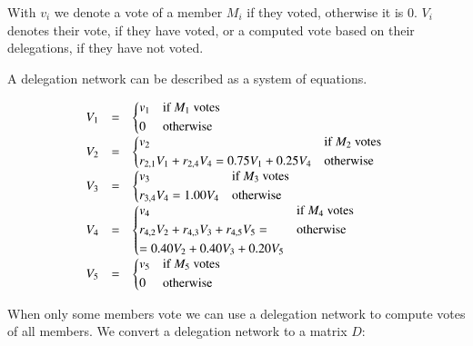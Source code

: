 \documentclass{sigchi}
\begin{document}
With $v_i$ we denote a vote of a member $M_i$ if they voted, otherwise it is $0$.
$V_i$ denotes their vote, if they have voted, or a computed vote based on their delegations, if they have not voted.

A delegation network can be described as a system of equations.


\begin{displaymath}
\begin{array}{rcl}
V_1 & = & \begin{dcases*}
 v_1 & if $M_1$ votes \\
 0 & otherwise \\
\end{dcases*} \\
V_2 & = & \begin{dcases*}
 v_2 & if $M_2$ votes \\
 r_{2,1} V_1 + r_{2,4} V_4 = 0.75 V_1 + 0.25 V_4 & otherwise \\
\end{dcases*} \\
V_3 & = & \begin{dcases*}
 v_3 & if $M_3$ votes \\
 r_{3,4} V_4 = 1.00 V_4 & otherwise \\
\end{dcases*} \\
V_4 & = & \begin{dcases*}
 v_4 & if $M_4$ votes \\
 r_{4,2} V_2+ r_{4,3} V_3 + r_{4,5} V_5 = & otherwise \\
 = 0.40 V_2 + 0.40 V_3 + 0.20 V_5 & \\
\end{dcases*} \\
V_5 & = & \begin{dcases*}
 v_5 & if $M_5$ votes \\
 0 & otherwise \\
\end{dcases*} \\
\end{array}
\end{displaymath}

When only some members vote we can use a delegation network to compute votes
of all members.
We convert a delegation network to a matrix $D$:
\end{document}
